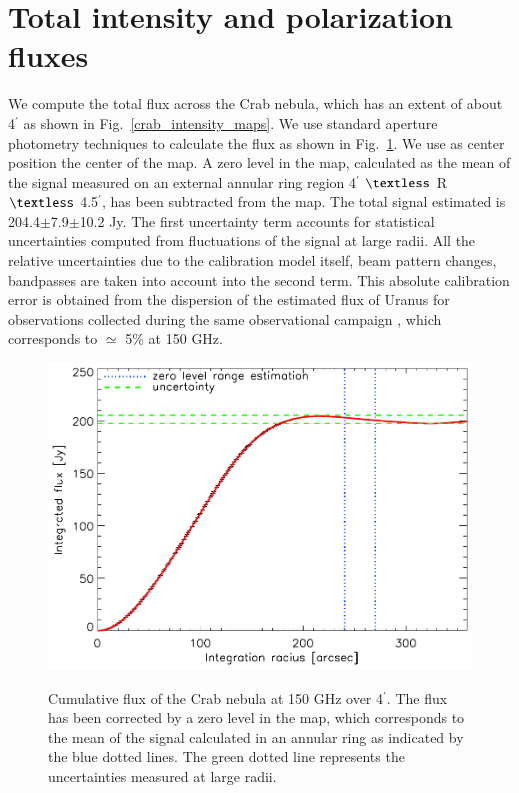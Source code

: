 \documentclass[twocolumn,traditabstract]{aa}
\begin{document}
\section{Total intensity and polarization fluxes}\label{sec:Polarization estimates in CMB experiments like beams}
We compute the total flux across the Crab nebula, which has an extent of about  4$^{\prime}$ as shown in Fig.~\ref{crab_intensity_maps}.
We use standard aperture photometry techniques to calculate the flux as shown in Fig.~\ref{crab_integrated_flux}. We use as center position the center of the map. A zero level in the map, calculated as the mean of the signal measured on an external annular ring region 4$^\prime$ $\textless$  R $\textless$ 4.5$^\prime$, has been subtracted from the map. The total signal estimated is 204.4$\pm$7.9$\pm$10.2 Jy. The first uncertainty term accounts for statistical uncertainties computed from fluctuations of the signal at large radii. All the relative uncertainties due to the calibration model itself, beam pattern changes, bandpasses are taken into account into the second term. This absolute calibration error is obtained from the dispersion of the estimated flux of Uranus for observations collected during the same observational campaign \citep{ritacco2017}, which corresponds to $\simeq$ 5\% at 150 GHz. 



\begin{figure}[h!]
  \centering
     { \includegraphics[width=0.85\linewidth,keepaspectratio]{figures/Crab_integrated_flux_2mm.pdf}}
     \caption{Cumulative flux of the Crab nebula at 150 GHz over 4$^{\prime}$. The flux has been corrected by a zero level in the map, which corresponds to the mean of the signal calculated in an annular ring as indicated by the blue dotted lines. The green dotted line represents the uncertainties measured at large radii.}
\label{crab_integrated_flux}
\end{figure}
\end{document}
